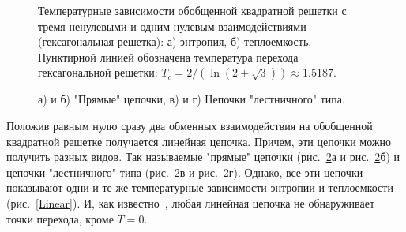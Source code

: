 \begin{figure}[h]
	\begin{minipage}[h]{0.5\linewidth}
	\end{minipage}
	\hfill
	\begin{minipage}[h]{0.5\linewidth}
	\end{minipage}
	\caption{Температурные зависимости обобщенной квадратной решетки с тремя ненулевыми и одним нулевым взаимодействиями (гексагональная решетка): а) энтропия, б) теплоемкость. Пунктирной линией обозначена температура перехода гексагональной решетки: $T_c = 2/(\ln(2+\sqrt{3}))\approx 1.5187$.}
	\label{Hex}
\end{figure}

\begin{figure}[h]
	\begin{minipage}{0.45\linewidth}
	\end{minipage}
	\hfill
	\begin{minipage}{0.45\linewidth}
	\end{minipage}
	\vfill
	\begin{minipage}{0.45\linewidth}
	\end{minipage}
	\hfill
	\begin{minipage}{0.45\linewidth}
	\end{minipage}
	\caption{а) и б) "Прямые" цепочки, в) и г) Цепочки "лестничного" типа.}
	\label{linearChains}
\end{figure}

Положив равным нулю сразу два обменных взаимодействия на обобщенной квадратной решетке получается линейная цепочка. Причем, эти цепочки можно получить разных видов. Так называемые "прямые" цепочки (рис.~\ref{linearChains}а и рис.~\ref{linearChains}б) и цепочки "лестничного" типа (рис.~\ref{linearChains}в и рис.~\ref{linearChains}г). Однако, все эти цепочки показывают одни и те же температурные зависимости энтропии и теплоемкости (рис.~\ref{Linear}). И, как известно~\cite{mussardo2010}, любая линейная цепочка не обнаруживает точки перехода, кроме $T=0$.

